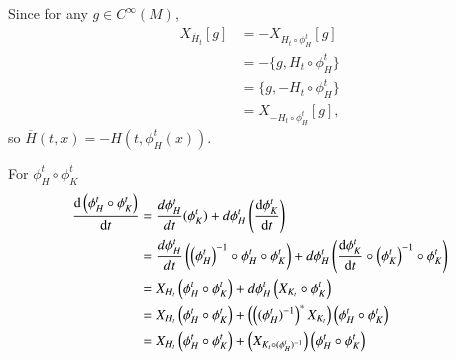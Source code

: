 \documentclass[a4paper, 12pt]{article}
\theoremstyle{Mydefinition}
\theoremstyle{Mytheorem}
\begin{document}
Since for any $g\in C^\infty(M)$,
\begin{equation*}
\begin{split}
X_{\overline{H}_t}[g] &= -X_{H_t\circ \phi^t_H}[g] \\
&= -\{g,H_t\circ \phi^t_H\}\\
&=\{g,-H_t\circ \phi^t_H\}\\
&=X_{-H_t\circ \phi^t_H}[g],
\end{split}
\end{equation*}
so $\overline{H}(t,x) = -H\left(t, \phi^t_H(x)\right)$.

For $\phi_H^t\circ \phi^t_K$
\begin{equation*}
\begin{split}
\dv{\left(\phi^t_H\circ \phi^t_K\right)}{t} &=\frac{d \phi^t_H}{d t}(\phi_K^t) +  d\phi_H^t\left(\dv{\phi_K^t}{t}\right)\\
&=\frac{d \phi^t_H}{d t}\left(\left(\phi^t_H\right)^{-1}\circ \phi^t_H \circ \phi_K^t\right) + d\phi_H^t\left(\dv{\phi_K^t}{t}\circ \left(\phi_K^t\right)^{-1}\circ \phi_K^t\right)\\
&=X_{H_t}\left(\phi^t_H \circ \phi_K^t\right) + d\phi_H^t\left(X_{K_t}\circ \phi_K^t\right)\\
&=X_{H_t}\left(\phi^t_H \circ \phi_K^t\right) + \left(\left((\phi_H^t)^{-1}\right)^*X_{K_t}\right)\left(\phi_H^t\circ \phi_K^t\right)\\
&=X_{H_t}\left(\phi^t_H \circ \phi_K^t\right) + \left(X_{K_t\circ (\phi_H^t)^{-1}}\right)\left(\phi_H^t\circ \phi_K^t\right)
\end{split}
\end{equation*}
\end{document}
